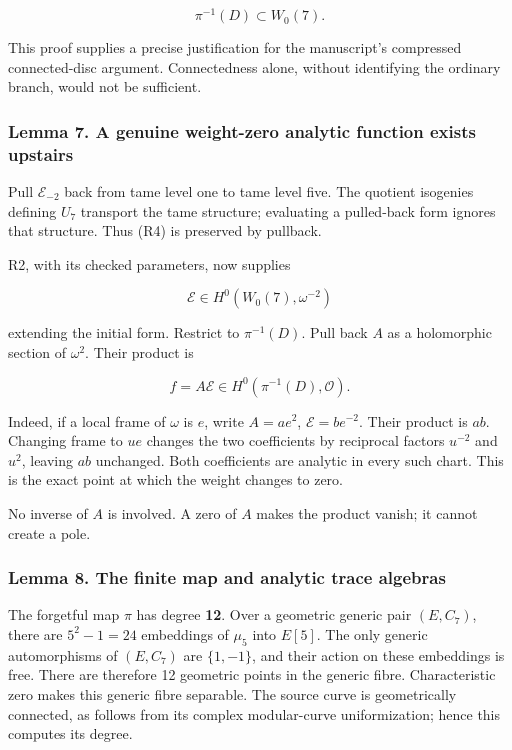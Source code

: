 \documentclass[11pt,a4paper]{article}
\begin{document}
\[
\boxed{\ \pi^{-1}(D)\subset W_0(7).\ }
\tag{R11}
\]

This proof supplies a precise justification for the manuscript's compressed connected-disc argument. Connectedness alone, without identifying the ordinary branch, would not be sufficient.

\hypertarget{lemma-7.-a-genuine-weight-zero-analytic-function-exists-upstairs}{%
\subsubsection{Lemma 7. A genuine weight-zero analytic function exists upstairs}\label{lemma-7.-a-genuine-weight-zero-analytic-function-exists-upstairs}}

Pull \(\mathcal E_{-2}\) back from tame level one to tame level five. The quotient isogenies defining \(U_7\) transport the tame structure; evaluating a pulled-back form ignores that structure. Thus (R4) is preserved by pullback.

R2, with its checked parameters, now supplies

\[
\mathcal E\in H^0(W_0(7),\omega^{-2})
\]

extending the initial form. Restrict to \(\pi^{-1}(D)\). Pull back \(A\) as a holomorphic section of \(\omega^2\). Their product is

\[
f=A\mathcal E\in H^0(\pi^{-1}(D),\mathcal O).
\tag{R12}
\]

Indeed, if a local frame of \(\omega\) is \(e\), write \(A=a e^2\), \(\mathcal E=b e^{-2}\). Their product is \(ab\). Changing frame to \(ue\) changes the two coefficients by reciprocal factors \(u^{-2}\) and \(u^2\), leaving \(ab\) unchanged. Both coefficients are analytic in every such chart. This is the exact point at which the weight changes to zero.

No inverse of \(A\) is involved. A zero of \(A\) makes the product vanish; it cannot create a pole.

\hypertarget{lemma-8.-the-finite-map-and-analytic-trace-algebras}{%
\subsubsection{Lemma 8. The finite map and analytic trace algebras}\label{lemma-8.-the-finite-map-and-analytic-trace-algebras}}

The forgetful map \(\pi\) has degree \textbf{12}. Over a geometric generic pair \((E,C_7)\), there are \(5^2-1=24\) embeddings of \(\mu_5\) into \(E[5]\). The only generic automorphisms of \((E,C_7)\) are \(\{1,-1\}\), and their action on these embeddings is free. There are therefore 12 geometric points in the generic fibre. Characteristic zero makes this generic fibre separable. The source curve is geometrically connected, as follows from its complex modular-curve uniformization; hence this computes its degree.
\end{document}
